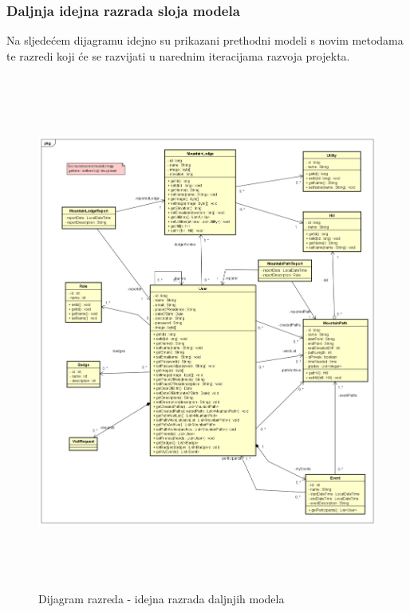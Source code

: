 			\subsubsection{Daljnja idejna razrada sloja modela}
			Na sljedećem dijagramu idejno su prikazani prethodni modeli s novim metodama te razredi koji će se razvijati u narednim iteracijama razvoja projekta. 
			\begin{figure}[H]
				\includegraphics[scale=0.6, height=170mm, width=165mm]{dijagrami/future-model.png} %
				\centering
				\caption{Dijagram razreda - idejna razrada daljnjih modela}
				\label{fig:dijagrami_razreda3}
			\end{figure}
			\newpage
